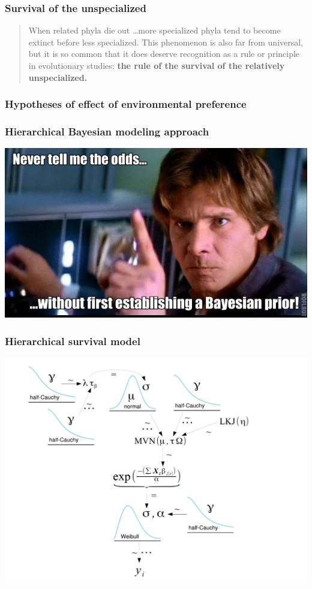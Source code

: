 \documentclass{beamer}
\begin{document}
\begin{frame}
  \frametitle{Survival of the unspecialized}
  \begin{quote}
    When related phyla die out \dots more specialized phyla tend to become extinct before less specialized. This phenomenon is also far from universal, but it is so common that it does deserve recognition as a rule or principle in evolutionary studies: \textbf{the rule of the survival of the relatively unspecialized.}

    \small{}
  \end{quote}
\end{frame}

\begin{frame}
  \frametitle{Hypotheses of effect of environmental preference}
\end{frame}

\begin{frame}
  \frametitle{Hierarchical Bayesian modeling approach}

  \includegraphics[width = \textwidth,height = 0.8\textheight,keepaspectratio = true]{figure/han_bayes}

  \tiny{}
\end{frame}

\begin{frame}
  \frametitle{Hierarchical survival model}
  \includegraphics[width = \textwidth,height = 0.8\textheight,keepaspectratio = true]{figure/brac_surv_model}
\end{frame}
\end{document}
